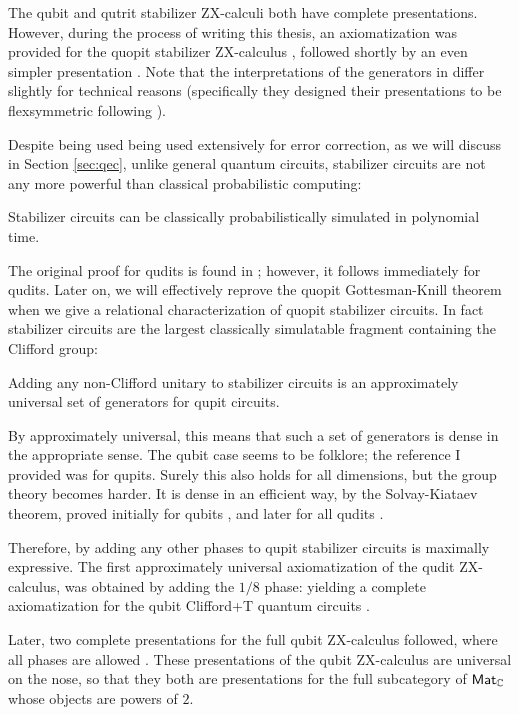 The qubit \cite{backensstab,backens2015} and qutrit \cite{qutrit} stabilizer ZX-calculi both have complete presentations.  However, during the process of writing this thesis, an axiomatization was provided for the quopit stabilizer ZX-calculus \cite{booth}, followed shortly by an even simpler presentation \cite{poor}.  Note that the interpretations of the generators in \cite{poor,booth} differ slightly for technical reasons (specifically they designed their presentations to be flexsymmetric following \cite[\S 5]{flexsymmetric}).


Despite being used being used extensively for error correction, as we will discuss in Section \ref{sec:qec}, unlike general quantum circuits, stabilizer circuits are not any more powerful than classical probabilistic computing:
\begin{theorem}
Stabilizer circuits can be classically probabilistically  simulated in polynomial time.
\end{theorem}
The original proof for qudits is found in  \cite{gottesmanknill}; however, it follows immediately for qudits.  Later on, we will effectively reprove the quopit Gottesman-Knill theorem when we give a relational characterization of quopit stabilizer circuits.  In fact stabilizer circuits are the largest classically simulatable fragment containing the Clifford group:
\begin{proposition}
\label{prop:campbell}
Adding any non-Clifford unitary to stabilizer circuits is an approximately universal set of generators for qupit  circuits.
\end{proposition}
By approximately universal, this means that such a set of generators is dense in the appropriate sense.
The qubit case seems to be folklore; the reference I provided was for qupits.  Surely this also holds for all dimensions, but the group theory becomes harder.  It is dense in an efficient way, by the Solvay-Kiataev theorem, proved initially for qubits  \cite{Kitaev1997}, and later for all qudits \cite[\S 5]{Dawson2006}.

Therefore, by adding any other phases to qupit stabilizer circuits is maximally expressive.  The first approximately universal axiomatization of the qudit ZX-calculus, was obtained by adding the $1/8$ phase: yielding a complete axiomatization for the qubit  Clifford+T quantum circuits \cite{Jeandel}.

Later, two complete presentations for the full qubit ZX-calculus followed,  where all phases are allowed  \cite{zxcompleteb,zxcompletea}. These presentations of the qubit ZX-calculus are universal on the nose, so that they both are presentations for the full subcategory of $\mathsf{Mat}_{\mathbb{C}}$ whose objects are powers of $2$.


